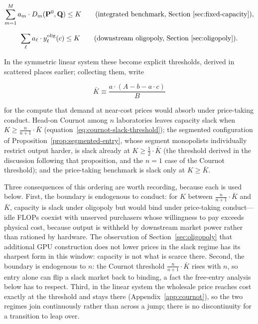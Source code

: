 \documentclass[11pt]{article}
\begin{document}
\begin{equation}\sum_{m=1}^{M}a_m\cdot D_m(\mathbf P^0,\mathbf Q)\leq K\qquad\text{(integrated benchmark, Section~\ref{sec:fixed-capacity})},\end{equation}

\begin{equation}\sum_\ell a_\ell\cdot y_\ell^{\mathrm{olig}}(c)\leq K\qquad\text{(downstream oligopoly, Section~\ref{sec:oligopoly})}.\end{equation}

In the symmetric linear system these become explicit thresholds, derived in scattered places earlier; collecting them, write

\begin{equation}\bar K\equiv\frac{a\cdot(A-b-a\cdot c)}{B}\end{equation}

for the compute that demand at near-cost prices would absorb under price-taking conduct. Head-on Cournot among $n$ laboratories leaves capacity slack when $K\geq\frac{n}{n+1}\cdot\bar K$ (equation~\eqref{eq:cournot-slack-threshold}); the segmented configuration of Proposition~\ref{prop:segmented-entry}, whose segment monopolists individually restrict output harder, is slack already at $K\geq\frac{1}{2}\cdot\bar K$ (the threshold derived in the discussion following that proposition, and the $n=1$ case of the Cournot threshold); and the price-taking benchmark is slack only at $K\geq\bar K$.

Three consequences of this ordering are worth recording, because each is used below. First, the boundary is endogenous to conduct: for $K$ between $\frac{n}{n+1}\cdot\bar K$ and $\bar K$, capacity is slack under oligopoly but would bind under price-taking conduct---idle FLOPs coexist with unserved purchasers whose willingness to pay exceeds physical cost, because output is withheld by downstream market power rather than rationed by hardware. The observation of Section~\ref{sec:oligopoly} that additional GPU construction does not lower prices in the slack regime has its sharpest form in this window: capacity is not what is scarce there. Second, the boundary is endogenous to $n$: the Cournot threshold $\frac{n}{n+1}\cdot\bar K$ rises with $n$, so entry alone can flip a slack market back to binding, a fact the free-entry analysis below has to respect. Third, in the linear system the wholesale price reaches cost exactly at the threshold and stays there (Appendix~\ref{app:cournot}), so the two regimes join continuously rather than across a jump; there is no discontinuity for a transition to leap over.
\end{document}
